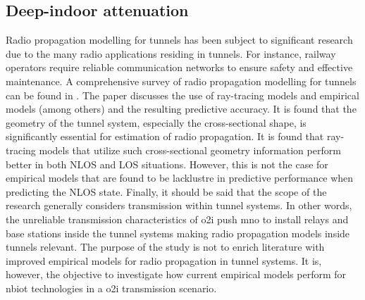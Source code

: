 \subsection{Deep-indoor attenuation}
Radio propagation modelling for tunnels has been subject to significant research due to the many radio applications residing in tunnels. For instance, railway operators require reliable communication networks to ensure safety and effective maintenance. A comprehensive survey of radio propagation modelling for tunnels can be found in \cite{Hrovat2014ATunnels}. The paper discusses the use of ray-tracing models and empirical models (among others) and the resulting predictive accuracy. It is found that the geometry of the tunnel system, especially the cross-sectional shape, is significantly essential for estimation of radio propagation. It is found that ray-tracing models that utilize such cross-sectional geometry information perform better in both NLOS and LOS situations. However, this is not the case for empirical models that are found to be lacklustre in predictive performance when predicting the NLOS state. Finally, it should be said that the scope of the research generally considers transmission within tunnel systems. In other words, the unreliable transmission characteristics of \gls{o2i} push \acrlong{mno} to install relays and base stations inside the tunnel systems making radio propagation models inside tunnels relevant. The purpose of the study is not to enrich literature with improved empirical models for radio propagation in tunnel systems. It is, however, the objective to investigate how current empirical models perform for \gls{nbiot} technologies in a \gls{o2i} transmission scenario.

